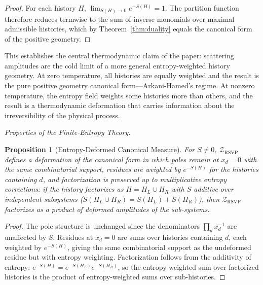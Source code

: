 \documentclass[11pt]{article}
\theoremstyle{plain}
\newtheorem{proposition}[theorem]{Proposition}
\theoremstyle{definition}
\theoremstyle{remark}
\newcommand{\Sf}{S}
\newcommand{\ZRSVP}{\mathcal{Z}_{\mathrm{RSVP}}}
\begin{document}
\begin{proof}
For each history $H$, $\lim_{\Sf(H) \to 0} e^{-\Sf(H)} = 1$. The partition function therefore reduces termwise to the sum of inverse monomials over maximal admissible histories, which by Theorem~\ref{thm:duality} equals the canonical form of the positive geometry.
\end{proof}

This establishes the central thermodynamic claim of the paper: scattering amplitudes are the cold limit of a more general entropy-weighted history geometry. At zero temperature, all histories are equally weighted and the result is the pure positive geometry canonical form---Arkani-Hamed's regime. At nonzero temperature, the entropy field weights some histories more than others, and the result is a thermodynamic deformation that carries information about the irreversibility of the physical process.

\medskip\noindent\textit{Properties of the Finite-Entropy Theory.}

\begin{proposition}[Entropy-Deformed Canonical Measure]
For $\Sf \neq 0$, $\ZRSVP$ defines a deformation of the canonical form in which poles remain at $x_d = 0$ with the same combinatorial support, residues are weighted by $e^{-\Sf(H)}$ for the histories containing $d$, and factorization is preserved up to multiplicative entropy corrections: if the history factorizes as $H = H_L \cup H_R$ with $\Sf$ additive over independent subsystems ($\Sf(H_L \cup H_R) = \Sf(H_L) + \Sf(H_R)$), then $\ZRSVP$ factorizes as a product of deformed amplitudes of the sub-systems.
\end{proposition}

\begin{proof}
The pole structure is unchanged since the denominators $\prod_d x_d^{-1}$ are unaffected by $\Sf$. Residues at $x_d = 0$ are sums over histories containing $d$, each weighted by $e^{-\Sf(H)}$, giving the same combinatorial support as the undeformed residue but with entropy weighting. Factorization follows from the additivity of entropy: $e^{-\Sf(H)} = e^{-\Sf(H_L)} e^{-\Sf(H_R)}$, so the entropy-weighted sum over factorized histories is the product of entropy-weighted sums over sub-histories.
\end{proof}
\end{document}
